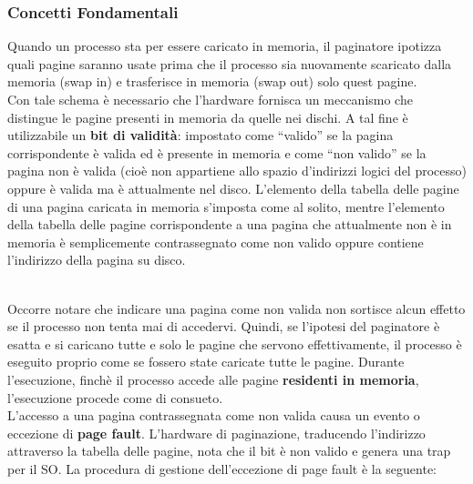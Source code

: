 \documentclass{article}
\begin{document}
			\subsubsection{Concetti Fondamentali}
				Quando un processo sta per essere caricato in memoria, il paginatore ipotizza quali pagine saranno usate prima che il processo sia nuovamente scaricato dalla memoria (swap in) e trasferisce in memoria (swap out) solo quest pagine. 
				\\Con tale schema è necessario che l’hardware fornisca un meccanismo che distingue le pagine presenti in memoria da quelle nei dischi. A tal fine è utilizzabile un \textbf{bit di validità}: impostato come “valido” se la pagina corrispondente è valida ed è presente in memoria e come “non valido” se la pagina non è valida (cioè non appartiene allo spazio d’indirizzi logici del processo) oppure è valida ma è attualmente nel disco. L’elemento della tabella delle pagine di una pagina caricata in memoria s’imposta come al solito, mentre l’elemento della tabella delle pagine corrispondente a una pagina che attualmente non è in memoria è semplicemente contrassegnato come non valido oppure contiene l’indirizzo della pagina su disco.
				\begin{figure}[ht!]
				\end{figure}
				\\Occorre notare che indicare una pagina come non valida non sortisce alcun effetto se il processo non tenta mai di accedervi. Quindi, se l’ipotesi del paginatore è esatta e si caricano tutte e solo le pagine che servono  effettivamente, il processo è eseguito proprio come se fossero state caricate tutte le pagine. Durante  l’esecuzione, finchè il processo accede alle pagine \textbf{residenti in memoria}, l’esecuzione procede come di consueto.
				\\L’accesso a una pagina contrassegnata come non valida causa un evento o eccezione di \textbf{page fault}. L’hardware di paginazione, traducendo l’indirizzo attraverso la tabella delle pagine, nota che il bit è non valido e genera una trap per il SO. La procedura di gestione dell’eccezione di page fault è la seguente:
\end{document}
